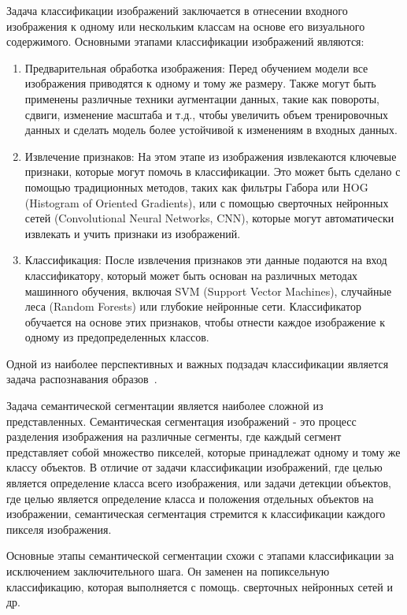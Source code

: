\documentclass[14pt, russian]{scrartcl}
\begin{document}
Задача классификации изображений заключается в отнесении входного изображения к одному или нескольким классам на основе его визуального содержимого. Основными этапами классификации изображений являются:

\begin{enumerate}
    \item Предварительная обработка изображения: Перед обучением модели все изображения приводятся к одному и тому же размеру. Также могут быть применены различные техники аугментации данных, такие как повороты, сдвиги, изменение масштаба и т.д., чтобы увеличить объем тренировочных данных и сделать модель более устойчивой к изменениям в входных данных.
    \item Извлечение признаков: На этом этапе из изображения извлекаются ключевые признаки, которые могут помочь в классификации. Это может быть сделано с помощью традиционных методов, таких как фильтры Габора или HOG (Histogram of Oriented Gradients), или с помощью сверточных нейронных сетей (Convolutional Neural Networks, CNN), которые могут автоматически извлекать и учить признаки из изображений.
    \item Классификация: После извлечения признаков эти данные подаются на вход классификатору, который может быть основан на различных методах машинного обучения, включая SVM (Support Vector Machines), случайные леса (Random Forests) или глубокие нейронные сети. Классификатор обучается на основе этих признаков, чтобы отнести каждое изображение к одному из предопределенных классов.
\end{enumerate}

Одной из наиболее перспективных и важных подзадач классификации является задача распознавания образов~\cite{20}.

Задача семантической сегментации является наиболее сложной из представленных. Семантическая сегментация изображений - это процесс разделения изображения на различные сегменты, где каждый сегмент представляет собой множество пикселей, которые принадлежат одному и тому же классу объектов. В отличие от задачи классификации изображений, где целью является определение класса всего изображения, или задачи детекции объектов, где целью является определение класса и положения отдельных объектов на изображении, семантическая сегментация стремится к классификации каждого пикселя изображения.

Основные этапы семантической сегментации схожи с этапами классификации за исключением заключительного шага. Он заменен на попиксельную классификацию, которая выполняется с помощь. сверточных нейронных сетей и др.
\end{document}
